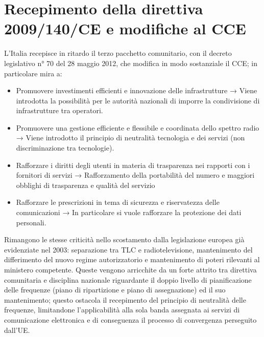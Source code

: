 \section{Recepimento della direttiva 2009/140/CE e modifiche al CCE}

L’Italia recepisce in ritardo il terzo pacchetto comunitario, con il decreto legislativo n° 70 del 28 maggio
2012, che modifica in modo sostanziale il CCE; in particolare mira a:
\begin{itemize}
    \item Promuovere investimenti efficienti e innovazione delle infrastrutture → Viene introdotta la possibilità per le autorità nazionali di imporre la condivisione di infrastrutture tra operatori.
    \item Promuovere una gestione efficiente e flessibile e coordinata dello spettro radio → Viene introdotto il principio di neutralità tecnologia e dei servizi (non discriminazione tra tecnologie).
    \item Rafforzare i diritti degli utenti in materia di trasparenza nei rapporti con i fornitori di servizi → Rafforzamento della portabilità del numero e maggiori obblighi di trasparenza e qualità del servizio
    \item Rafforzare le prescrizioni in tema di sicurezza e riservatezza delle comunicazioni → In particolare si vuole rafforzare la protezione dei dati personali.
\end{itemize}

Rimangono le stesse criticità nello scostamento dalla legislazione europea già evidenziate nel 2003: separazione tra TLC e radiotelevisione, mantenimento del differimento del nuovo regime autorizzatorio e mantenimento di poteri rilevanti al ministero competente. Queste vengono arricchite da un forte attrito tra direttiva comunitaria e disciplina nazionale riguardante il doppio livello di pianificazione delle frequenze (piano di ripartizione e piano di assegnazione) ed il suo mantenimento; questo ostacola il recepimento del principio di neutralità delle frequenze, limitandone l’applicabilità alla sola banda assegnata ai servizi di
comunicazione elettronica e di conseguenza il processo di convergenza perseguito dall’UE.